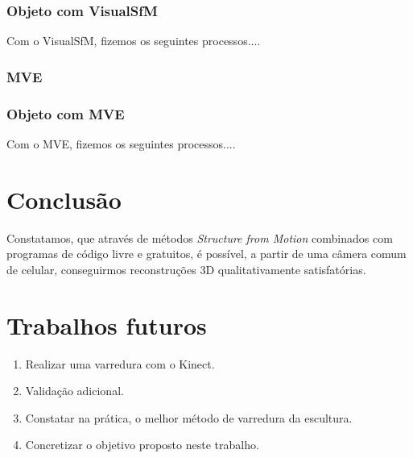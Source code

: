 \documentclass[table, usenames, svgnames, xcolor=dvipsnames]{beamer}
\begin{document}
\begin{frame}
\frametitle{\textbf{Objeto com VisualSfM}}
	Com o VisualSfM, fizemos os seguintes processos....
\end{frame}

\subsubsection{MVE}

\begin{frame}
\frametitle{\textbf{Objeto com MVE}}
	Com o MVE, fizemos os seguintes processos....
\end{frame}

\section{Conclusão}

\begin{frame}
	\begin{center}
	Constatamos, que através de métodos \emph{Structure from Motion} combinados com programas de código livre e gratuitos, é possível, a partir de uma câmera comum de celular, conseguirmos  reconstruções 3D qualitativamente satisfatórias.
	\end{center}
\end{frame}

\section{Trabalhos futuros}

\begin{frame}
	\begin{enumerate}
    	\item {Realizar uma varredura com o Kinect.}
 \item {Validação adicional.} 
\item {Constatar na prática, o melhor método de varredura da escultura.} 
\item {Concretizar o objetivo proposto neste trabalho.}
	\end{enumerate}
\end{frame}
\end{document}
